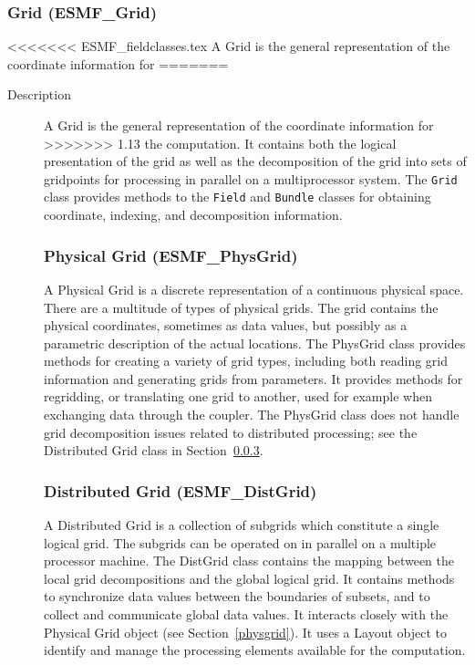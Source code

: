 \subsubsection{Grid (ESMF\_Grid)}
<<<<<<< ESMF_fieldclasses.tex
\label{sec:ordering} 
A Grid is the general representation of the coordinate information for
=======
\label{sec:grid} 
\begin{description}
\item [Description] A Grid is the general representation of the coordinate information for
>>>>>>> 1.13
the computation.  It contains both the logical presentation of the grid as well as the
decomposition of the grid into sets of gridpoints for processing in parallel on a
multiprocessor system.  The {\tt Grid} class provides methods to the
{\tt Field} and {\tt Bundle} classes for obtaining coordinate, indexing, and 
decomposition information.

\subsubsection{Physical Grid (ESMF\_PhysGrid)}
\label{sec:physgrid} 
A Physical Grid is a discrete representation of a continuous physical space.
There are a multitude of types of physical grids.
The grid contains the physical coordinates, sometimes as data values, but possibly
as a parametric description of the actual locations.  
The PhysGrid class provides methods for creating a variety of grid 
types, including both reading grid information
and generating grids from parameters.  It provides methods for regridding, or translating
one grid to another, used for example when exchanging data through the coupler.
The PhysGrid class does not handle grid decomposition issues related to 
distributed processing; see the Distributed Grid class in Section~\ref{sec:distgrid}.

\subsubsection{Distributed Grid (ESMF\_DistGrid)} 
\label{sec:distgrid} 
A Distributed Grid is a collection of subgrids which
constitute a single logical grid.  The subgrids can be operated on in
parallel on a multiple processor machine.  The DistGrid class contains the mapping
between the local grid decompositions and the global logical grid. 
It contains methods to 
synchronize data values between the boundaries of subsets, and to
collect and communicate global data values.  It interacts closely with
the Physical Grid object (see Section~\ref{physgrid}).
It uses a Layout object to identify and manage the processing elements 
available for the computation.


\end{description}
